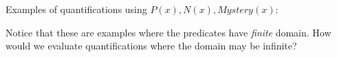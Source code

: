 
Examples of quantifications using $P(x), N(x), Mystery(x)$:

\vspace{100pt}

Notice that these are examples where the predicates have {\it finite} domain.
How would we evaluate quantifications where the domain may be infinite?
